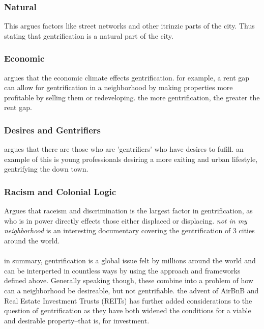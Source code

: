 \documentclass[12pt]{book}
\begin{document}
\subsubsection{Natural}
This argues factors like street networks and other itrinzic parts of the city.
Thus stating that gentrification is a natural part of the city.

\subsubsection{Economic}
argues that the economic climate effects gentrification.
for example, a rent gap can allow for gentrification in a neighborhood by making properties more profitable by selling them
        or redeveloping. the more gentrification, the greater the rent gap.

\subsubsection{Desires and Gentrifiers}
argues that there are those who are 'gentrifiers' who have desires to fufill. 
an example of this is young professionals desiring a more exiting and urban lifestyle, gentrifying the down town. 

\subsubsection{Racism and Colonial Logic}
Argues that raceism and discrimination is the largest factor in gentrification, as who is in power directly 
        effects those either displaced or displacing.
\textit{not in my neighborhood} is an interesting documentary covering the gentrification of 3 cities around the world.

\paragraph{}
in summary, gentrification is a global issue felt by millions around the world and can be interperted in countless ways by using
        the approach and frameworks defined above. 
Generally speaking though, these combine into a problem of how can a neighborhood be desireable, but not gentrifiable.
the advent of AirBnB and Real Estate Investment Trusts (REITs) has further added considerations to the question of gentrification
        as they have both widened the conditions for a viable and desirable property--that is, for investment.
\end{document}
